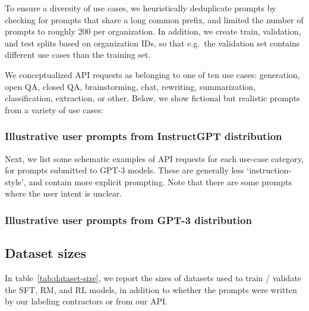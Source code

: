 To ensure a diversity of use cases, we heuristically deduplicate prompts by checking for prompts that share a long common prefix, and limited the number of prompts to roughly 200 per organization. In addition, we create train, validation, and test splits based on organization IDs, so that e.g.\ the validation set contains different use cases than the training set.

We conceptualized API requests as belonging to one of ten use cases: generation, open QA, closed QA, brainstorming, chat, rewriting, summarization, classification, extraction, or other. Below, we show fictional but realistic prompts from a variety of use cases:

\subsubsection{Illustrative user prompts from InstructGPT distribution}
\label{apdx:instructgpt-prompts}





Next, we list some schematic examples of API requests for each use-case category, for prompts submitted to GPT-3 models. These are generally less `instruction-style', and contain more explicit prompting. Note that there are some prompts where the user intent is unclear. 
\subsubsection{Illustrative user prompts from GPT-3 distribution}
\label{apdx:gpt3-prompts}





\subsection{Dataset sizes}

In table~\ref{tab:dataset-size}, we report the sizes of datasets used to train / validate the SFT, RM, and RL models, in addition to whether the prompts were written by our labeling contractors or from our API.

